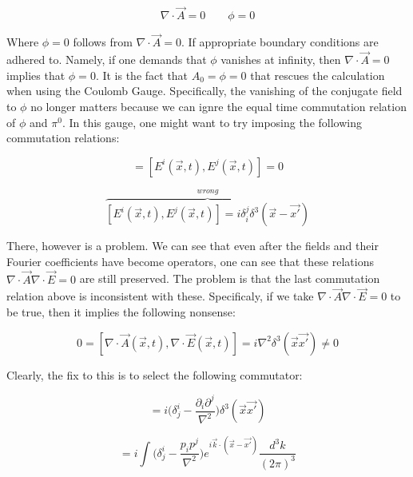 \documentclass[a4]{article}
\begin{document}
    \begin{equation}
        \nabla \cdot \vec{A} = 0 \qquad \phi = 0
    \end{equation}

    Where $\phi = 0$ follows from $\nabla \cdot \vec{A} = 0$. If appropriate boundary conditions are adhered to. Namely, if one demands that $\phi$ vanishes at infinity, then
    $\nabla \cdot \vec{A} = 0$ implies that $\phi = 0$. It is the fact that $A_{0} = \phi = 0$ that rescues the calculation when using the Coulomb Gauge. Specifically, the
    vanishing of the conjugate field to $\phi$ no longer matters because we can ignre the equal time commutation relation of $\phi$ and $\pi^{0}$. In this gauge, one might want
    to try imposing the following commutation relations:

    \begin{equation}
        [A_{i} (\vec{x}, t), A_{j} (\vec{x}, t)] = [E^{i} (\vec{x}, t), E^{j} (\vec{x}, t)] = 0
    \end{equation}

    \begin{equation}
        \overbrace{[E^{i} (\vec{x}, t), E^{j} (\vec{x}, t)] = i \delta^{j}_{i} \delta^{3} (\vec{x} - \vec{x'})}^{wrong}
    \end{equation}

    There, however is a problem. We can see that even after the fields and their Fourier coefficients have become operators, one can see that these relations $\nabla \cdot \vec{A}
    \nabla \cdot \vec{E} = 0$ are still preserved. The problem is that the last commutation relation above is inconsistent with these. Specificaly, if we take $\nabla \cdot \vec{A}
    \nabla \cdot \vec{E} = 0$ to be true, then it implies the following nonsense:

    \begin{equation}
        0 = [\nabla \cdot \vec{A} (\vec{x}, t), \nabla \cdot \vec{E} (\vec{x}, t)] = i \nabla^{2} \delta^{3} (\vec{x} \vec{x'}) \neq 0
    \end{equation}

    Clearly, the fix to this is to select the following commutator:

    \begin{equation}
        [E^{i} (\vec{x}, t), E^{j} (\vec{x}, t)] = i \bigg( \delta^{i}_{j} - \frac{\partial_{i} \partial^{j}}{\nabla^{2}} \bigg) \delta^{3} (\vec{x} \vec{x'})
    \end{equation}

    \begin{equation}
        [E^{i} (\vec{x}, t), E^{j} (\vec{x}, t)] = i \int \bigg( \delta^{i}_{j} - \frac{p_{i} p^{j}}{\nabla^{2}} \bigg) e^{i \vec{k} \cdot (\vec{x} - \vec{x'})} \frac{d^{3} k}{(2 \pi)^3}
    \end{equation}
\end{document}
